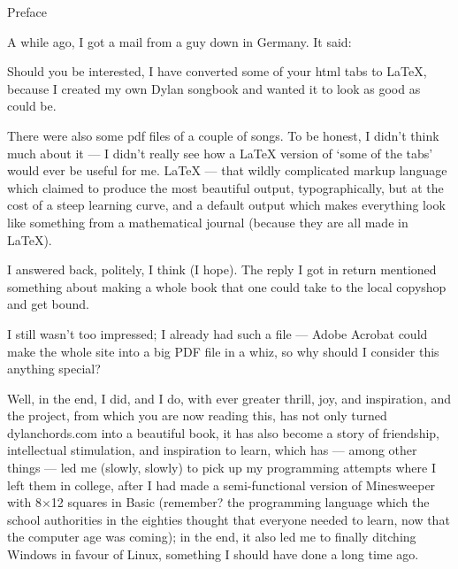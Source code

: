 
\thispagestyle{empty}
\label{preface}

\vspace*{20ex}

\begin{articlelayout}
\begin{flushright}{\Huge Preface}\end{flushright}

\vspace{10ex}
    
\noindent A while ago, I got a mail from a guy down in Germany. It said:
 
Should you be interested, I have converted some of your html tabs to
LaTeX, because I created my own Dylan songbook and wanted it to look
as good as could be.
  
There were also some pdf files of a couple of songs. To be honest, I
didn't think much about it --- I didn't really see how a LaTeX version
of `some of the tabs' would ever be useful for me. LaTeX ---
that wildly complicated markup language which claimed to produce the
most beautiful output, typographically, but at the cost of a steep
learning curve, and a default output which makes everything look like
something from a mathematical journal (because they are all made in
LaTeX).
 
I answered back, politely, I think (I hope). The reply I got in return
mentioned something about making a whole book that one could take to
the local copyshop and get bound.
 
I still wasn't too impressed; I already had such a file --- Adobe
Acrobat could make the whole site into a big PDF file in a whiz, so
why should I consider this anything special?
  
Well, in the end, I did, and I do, with ever greater thrill, joy, and
inspiration, and the project, from which you are now reading this, has
not only turned dylanchords.com into a beautiful book, it has also
become a story of friendship, intellectual stimulation, and
inspiration to learn, which has --- among other things --- led me
(slowly, slowly) to pick up my programming attempts where I left them
in college, after I had made a semi-functional version of Minesweeper
with 8$\times$12 squares in Basic (remember? the programming language which
the school authorities in the eighties thought that everyone needed to
learn, now that the computer age was coming); in the end, it also led
me to finally ditching Windows in favour of Linux, something I should
have done a long time ago.


\end{articlelayout}
